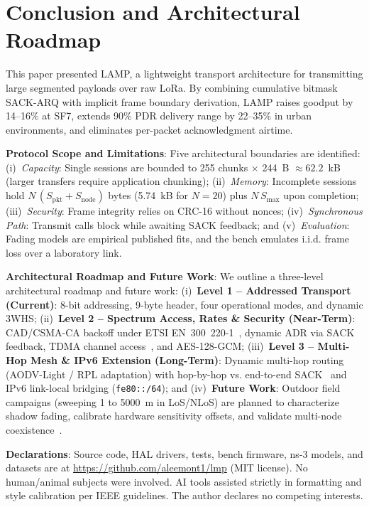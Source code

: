 \documentclass[journal]{IEEEtran}
\begin{document}
\section{Conclusion and Architectural Roadmap}
\label{sec:conclusion}
This paper presented \ac{LAMP}, a lightweight transport architecture for transmitting large segmented payloads over raw \ac{LoRa}. By combining cumulative bitmask SACK-ARQ with implicit frame boundary derivation, \ac{LAMP} raises goodput by 14--16\% at SF7, extends 90\% PDR delivery range by 22--35\% in urban environments, and eliminates per-packet acknowledgment airtime.

\noindent\textbf{Protocol Scope and Limitations}: Five architectural boundaries are identified: (i)~\textit{Capacity}: Single sessions are bounded to 255 chunks $\times$ 244~B $\approx 62.2$~kB (larger transfers require application chunking); (ii)~\textit{Memory}: Incomplete sessions hold $N\,(S_{\mathrm{pkt}}+S_{\mathrm{node}})$ bytes (5.74~kB for $N=20$) plus $N\,S_{\max}$ upon completion; (iii)~\textit{Security}: Frame integrity relies on CRC-16 without nonces; (iv)~\textit{Synchronous Path}: Transmit calls block while awaiting SACK feedback; and (v)~\textit{Evaluation}: Fading models are empirical published fits, and the bench emulates i.i.d. frame loss over a laboratory link.

\noindent\textbf{Architectural Roadmap and Future Work}: We outline a three-level architectural roadmap and future work: (i)~\textbf{Level 1 -- Addressed Transport (Current)}: 8-bit addressing, 9-byte header, four operational modes, and dynamic 3WHS; (ii)~\textbf{Level 2 -- Spectrum Access, Rates \& Security (Near-Term)}: CAD/CSMA-CA backoff under ETSI EN~300~220-1~\cite{etsi300220}, dynamic ADR via SACK feedback, TDMA channel access~\cite{wei2020tdm}, and AES-128-GCM; (iii)~\textbf{Level 3 -- Multi-Hop Mesh \& IPv6 Extension (Long-Term)}: Dynamic multi-hop routing (AODV-Light / RPL adaptation) with hop-by-hop vs. end-to-end SACK~\cite{kim2022multihop, wong2024mesh, sole2026largetransfer} and IPv6 link-local bridging (\texttt{fe80::/64}); and (iv)~\textbf{Future Work}: Outdoor field campaigns (sweeping 1 to 5000~m in LoS/NLoS) are planned to characterize shadow fading, calibrate hardware sensitivity offsets, and validate multi-node coexistence~\cite{cattani2017}.

\noindent\textbf{Declarations}: Source code, HAL drivers, tests, bench firmware, ns-3 models, and datasets are at \url{https://github.com/aleemont1/lmp} (MIT license). No human/animal subjects were involved. AI tools assisted strictly in formatting and style calibration per IEEE guidelines. The author declares no competing interests.



\end{document}
